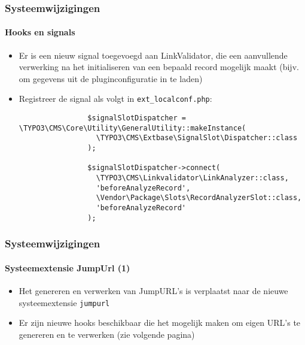 \begin{frame}[fragile]
	\frametitle{Systeemwijzigingen}
	\framesubtitle{Hooks en signals}

	\lstset{basicstyle=\tiny\ttfamily}

	\begin{itemize}

		\item Er is een nieuw signal toegevoegd aan LinkValidator, die een aanvullende verwerking
			na het initialiseren van een bepaald record mogelijk maakt
			\newline
			\small
				(bijv. om gegevens uit de pluginconfiguratie in te laden)
			\normalsize

		\item Registreer de signal als volgt in \texttt{ext\_localconf.php}:

			\begin{lstlisting}
				$signalSlotDispatcher = \TYPO3\CMS\Core\Utility\GeneralUtility::makeInstance(
				  \TYPO3\CMS\Extbase\SignalSlot\Dispatcher::class
				);

				$signalSlotDispatcher->connect(
				  \TYPO3\CMS\Linkvalidator\LinkAnalyzer::class,
				  'beforeAnalyzeRecord',
				  \Vendor\Package\Slots\RecordAnalyzerSlot::class,
				  'beforeAnalyzeRecord'
				);
			\end{lstlisting}

	\end{itemize}

\end{frame}


\begin{frame}[fragile]
	\frametitle{Systeemwijzigingen}
	\framesubtitle{Systeemextensie JumpUrl (1)}

	\lstset{basicstyle=\tiny\ttfamily}

	\begin{itemize}

		\item Het genereren en verwerken van JumpURL's is verplaatst naar de nieuwe systeemextensie \texttt{jumpurl}

		\item Er zijn nieuwe hooks beschikbaar die het mogelijk maken om eigen URL's te genereren
			en te verwerken (zie volgende pagina)

	\end{itemize}

	\breakingchange

\end{frame}

